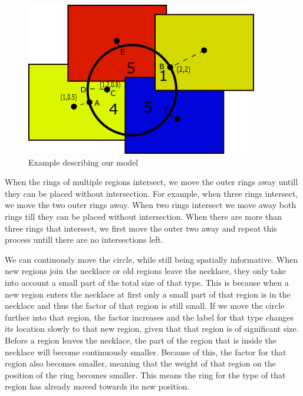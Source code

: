 \documentclass[a4paper,11pt]{article}
\begin{document}
\begin{figure}[H]
	\centering
	\includegraphics{figure1.png}
	\caption{Example describing our model}
	\label{fig:example}
\end{figure}

When the rings of multiple regions intersect, we move the outer rings away untill they can be placed without intersection.
For example, when three rings intersect, we move the two outer rings away.
When two rings intersect we move away both rings till they can be placed without intersection. 
When there are more than three rings that intersect, we first move the outer two away and repeat this process untill there are no intersections left.

We can continously move the circle, while still being spatially informative. 
When new regions join the necklace or old regions leave the necklace, they only take into account a small part of the total size of that type. 
This is because when a new region enters the necklace at first only a small part of that region is in the necklace and thus the factor of that region is still small. 
If we move the circle further into that region, the factor increases and the label for that type changes its location slowly to that new region, given that that region is of significant size.
Before a region leaves the necklace, the part of the region that is inside the necklace will become continuously smaller.
Because of this, the factor for that region also becomes smaller, meaning that the weight of that region on the position of the ring becomes smaller.
This means the ring for the type of that region has already moved towards its new position.
\end{document}
